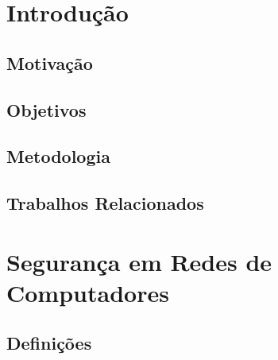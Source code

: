 \documentclass[
	12pt,				
	openright,		
	twoside,	
	a4paper,
	english,	
	brazil	
	]{abntex2}
\begin{document}
\chapter{Introdução} \label{ch:introdução}
\section{Motivação} \label{sec:motivação}
\section{Objetivos} \label{sec:objetivos}
\section{Metodologia} \label{sec:metodologia}
\section{Trabalhos Relacionados} \label{sec:relacionados}
\chapter{Segurança em Redes de Computadores} \label{ch:segurança}
\section{Definições} \label{sec:definições}
\end{document}
